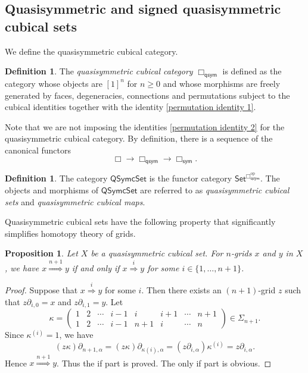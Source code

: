\documentclass[oneside, 12pt]{amsart}
\numberwithin{equation}{section}
\theoremstyle{plain}
\newtheorem{proposition}[theorem]{Proposition}
\theoremstyle{definition}
\newtheorem{definition}[theorem]{Definition}
\theoremstyle{remark}
\newcommand{\QSymcSet}{\mathsf{QSymcSet}}
\begin{document}
	
	
	\subsection{Quasisymmetric and signed quasisymmetric cubical sets}
	
	We define the quasisymmetric cubical category.
	
	
	
	\begin{definition}
		The \emph{quasisymmetric cubical category} $\Box_\mathsf{qsym}$ is defined as the category whose objects are $[1]^n$ for $n\ge 0$ and whose morphisms are freely generated by faces, degeneracies, connections and permutations subject to the cubical identities together with the identity \eqref{permutation identity 1}.
	\end{definition}
	
	
	
	Note that we are not imposing the identities \eqref{permutation identity 2} for the quasisymmetric cubical category. By definition, there is a sequence of the canonical functors
	\[
	\Box\to\Box_\mathsf{qsym}\to\Box_\mathsf{sym}.
	\]
	
	
	
	\begin{definition}
		The category $\QSymcSet$ is the functor category $\mathsf{Set}^{\Box_\mathsf{qsym}^\mathrm{op}}$. The objects and morphisms of $\QSymcSet$ are referred to as \emph{quasisymmetric cubical sets} and \emph{quasisymmetric cubical maps}.
	\end{definition}
	
	
	
	
	Quasisymmetric cubical sets have the following property that significantly simplifies homotopy theory of grids.
	
	
	
	\begin{proposition}
		\label{symmetric homotopy}
		Let $X$ be a quasisymmetric cubical set. For $n$-grids $x$ and $y$ in $X$, we have $x\overset{n+1}{\Rightarrow}y$ if and only if $x\overset{i}{\Rightarrow}y$ for some $i\in\{1,\ldots,n+1\}$.
	\end{proposition}
	
	\begin{proof}
		Suppose that $x\overset{i}{\Rightarrow}y$ for some $i$. Then there exists an $(n+1)$-grid $z$ such that $z\partial_{i,0}=x$ and $z\partial_{i,1}=y$. Let 
		\[\kappa=\begin{pmatrix}
			1&2&\cdots&i-1&i&i+1&\cdots&n+1\\
			1&2&\cdots&i-1&n+1&i&\cdots&n
		\end{pmatrix}
		\in\Sigma_{n+1}.
		\]
		Since $\kappa^{(i)}=1$, we have
		\[
		(z\kappa)\partial_{n+1,\alpha}=(z\kappa)\partial_{\kappa(i),\alpha}=(z\partial_{i,\alpha})\kappa^{(i)}=z\partial_{i,\alpha}.
		\]
		Hence $x\overset{n+1}{\Rightarrow}y$. Thus the if part is proved. The only if part is obvious.
	\end{proof}
	
\end{document}

